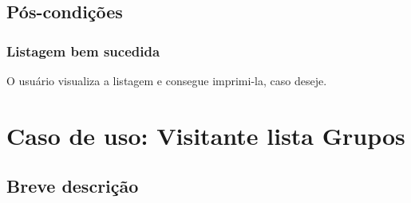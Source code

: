 \documentclass[11pt, a4paper,oneside]{book}
\begin{document}
%
%
%
%

\section{Pós-condições}

\subsection{Listagem bem sucedida}

O usuário visualiza a listagem e consegue imprimi-la, caso deseje.

%

\chapter[Caso de Uso]{Caso de uso: \bf Visitante lista Grupos}
\label{cap:casodeuso}	

\section{Breve descrição}
\end{document}
